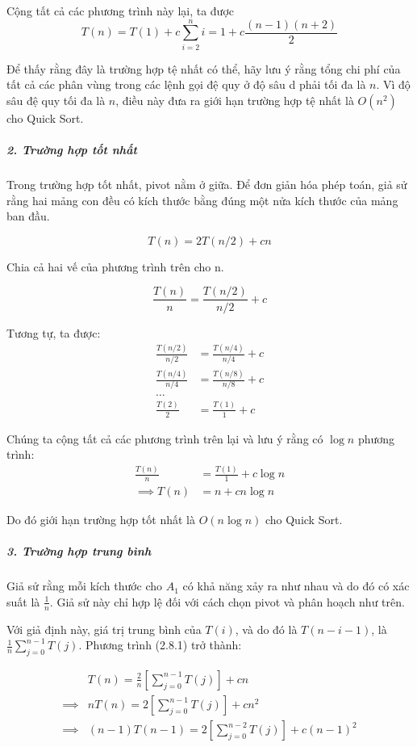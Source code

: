 Cộng tất cả các phương trình này lại, ta được 
$$T(n) = T(1) + c \sum_{i = 2}^{n}i = 1 + c \frac{(n - 1)(n + 2)}{2}$$

Để thấy rằng đây là trường hợp tệ nhất có thể, hãy lưu ý rằng tổng chi phí của tất cả các phân vùng trong các lệnh gọi đệ quy ở độ sâu d phải tối đa là $n$. Vì độ sâu đệ quy tối đa là $n$, điều này đưa ra giới hạn trường hợp tệ nhất là $O(n^2)$ cho Quick Sort.

\subparagraph{2. Trường hợp tốt nhất}

Trong trường hợp tốt nhất, pivot nằm ở giữa. Để đơn giản hóa phép toán, giả sử rằng hai mảng con đều có kích thước bằng đúng một nửa kích thước của mảng ban đầu.

$$T(n) = 2T(n / 2) + cn$$

Chia cả hai vế của phương trình trên cho n. 

$$\frac{T(n)}{n} = \frac{T(n / 2)}{n / 2} + c$$

Tương tự, ta được:
\begin{align*}
    \frac{T(n/2)}{n/2} &= \frac{T(n / 4)}{n / 4} + c \\
    \frac{T(n/4)}{n/4} &= \frac{T(n / 8)}{n / 8} + c \\
    \dots \\
    \frac{T(2)}{2} &= \frac{T(1)}{1} + c
\end{align*}

Chúng ta cộng tất cả các phương trình trên lại và lưu ý rằng có $\log{n}$ phương trình:
\begin{align*}
    \frac{T(n)}{n} &= \frac{T(1)}{1} + c \log{n} \\
    \implies T(n) &= n + cn\log{n} 
\end{align*}

Do đó giới hạn trường hợp tốt nhất là $O(n\log{n})$ cho Quick Sort.

\subparagraph{3. Trường hợp trung bình}
Giả sử rằng mỗi kích thước cho $A_1$ có khả năng xảy ra như nhau và do đó có xác suất là $\frac{1}{n}$. Giả sử này chỉ hợp lệ đối với cách chọn pivot và phân hoạch như trên. 

Với giả định này, giá trị trung bình của $T(i)$, và do đó là $T(n - i - 1)$, là $\frac{1}{n} \sum_{j = 0}^{n - 1}T(j)$. Phương trình  (2.8.1) trở thành: 

\begin{align*}
    & T(n) = \frac{2}{n} \left[\sum_{j = 0}^{n - 1}T(j) \right] + cn \\
    \implies  &nT(n) = 2 \left[\sum_{j = 0}^{n - 1}T(j) \right] + cn^2 \tag{2.8.2} \\
    \implies  &(n - 1)T(n - 1) = 2 \left[\sum_{j = 0}^{n - 2}T(j) \right] + c(n - 1)^2 \tag{2.8.3}
\end{align*}

